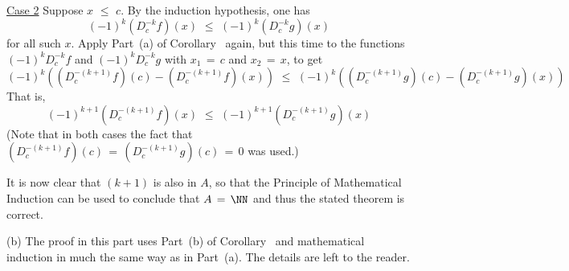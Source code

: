 {        \underline{Case 2} Suppose $x\,\,{\leq}\,\,c$. By the induction hypothesis, one has
        \begin{displaymath}
        (-1)^{k}\left(D^{-k}_{c} f\right)(x)\,\,{\leq}\,\,(-1)^{k}\left(D^{-k}_{c} g\right)(x)
        \end{displaymath}
    for all such $x$.
    Apply Part~(a) of Corollary~ again, but this time to the functions $(-1)^{k}D^{-k}_{c} f$ and $(-1)^{k}D^{-k}_{c} g$ with $x_{1} \,=\, c$ and $x_{2} \,=\, x$, to get
        \begin{displaymath}
        (-1)^{k}\left(\left(D^{-(k+1)}_{c} f\right)(c) - \left(D^{-(k+1)}_{c} f\right)(x)\right) 
    \,\,{\leq}\,\,
        (-1)^{k}\left(\left(D^{-(k+1)}_{c} g\right)(c) - \left(D^{-(k+1)}_{c} g\right)(x)\right) 
        \end{displaymath}
    That is,
        \begin{displaymath}
        (-1)^{k+1}\left(D^{-(k+1)}_{c} f\right)(x)
        \,\,{\leq}\,\,
        (-1)^{k+1}\left(D^{-(k+1)}_{c} g\right)(x)
        \end{displaymath}
    (Note that in both cases the fact that $\left(D^{-(k+1)}_{c} f\right)(c) \,=\, \left(D^{-(k+1)}_{c} g\right)(c) \,=\, 0$ was used.)

        It is now clear that $(k+1)$ is also in $A$, so that the Principle of Mathematical Induction can be used to conclude that $A \,=\, {\NN}$ and thus the stated theorem is correct.

\V

        (b) The proof in this part uses Part~(b) of Corollary~ and mathematical induction in much the same way as in Part~(a).
    The details are left to the reader. \Q

\VV

}%

